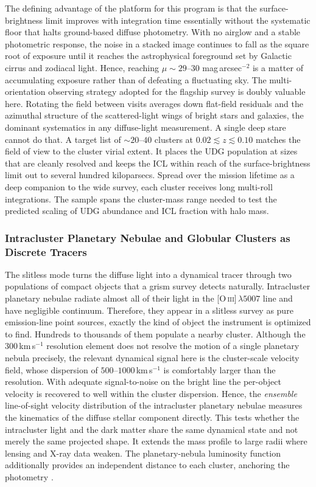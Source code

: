 \documentclass[10pt,onecolumn]{article}
\begin{document}
The defining advantage of the platform for this program is that the surface-brightness limit improves with integration time essentially without the systematic floor that halts ground-based diffuse photometry. With no airglow and a stable photometric response, the noise in a stacked image continues to fall as the square root of exposure until it reaches the astrophysical foreground set by Galactic cirrus and zodiacal light. Hence, reaching $\mu\sim29$--$30$ mag\,arcsec$^{-2}$ is a matter of accumulating exposure rather than of defeating a fluctuating sky. The multi-orientation observing strategy adopted for the flagship survey is doubly valuable here. Rotating the field between visits averages down flat-field residuals and the azimuthal structure of the scattered-light wings of bright stars and galaxies, the dominant systematics in any diffuse-light measurement. A single deep stare cannot do that. A target list of $\sim20$--$40$ clusters at $0.02\lesssim z\lesssim0.10$ matches the field of view to the cluster virial extent. It places the UDG population at sizes that are cleanly resolved and keeps the ICL within reach of the surface-brightness limit out to several hundred kiloparsecs. Spread over the mission lifetime as a deep companion to the wide survey, each cluster receives long multi-roll integrations. The sample spans the cluster-mass range needed to test the predicted scaling of UDG abundance and ICL fraction with halo mass.

\subsubsection{Intracluster Planetary Nebulae and Globular Clusters as Discrete Tracers}

The slitless mode turns the diffuse light into a dynamical tracer through two populations of compact objects that a grism survey detects naturally. Intracluster planetary nebulae radiate almost all of their light in the [O\,\textsc{iii}]\,$\lambda5007$ line and have negligible continuum. Therefore, they appear in a slitless survey as pure emission-line point sources, exactly the kind of object the instrument is optimized to find. Hundreds to thousands of them populate a nearby cluster. Although the $300$\,km\,s$^{-1}$ resolution element does not resolve the motion of a single planetary nebula precisely, the relevant dynamical signal here is the cluster-scale velocity field, whose dispersion of $500$--$1000$\,km\,s$^{-1}$ is comfortably larger than the resolution. With adequate signal-to-noise on the bright line the per-object velocity is recovered to well within the cluster dispersion. Hence, the \emph{ensemble} line-of-sight velocity distribution of the intracluster planetary nebulae measures the kinematics of the diffuse stellar component directly. This tests whether the intracluster light and the dark matter share the same dynamical state and not merely the same projected shape. It extends the mass profile to large radii where lensing and X-ray data weaken. The planetary-nebula luminosity function additionally provides an independent distance to each cluster, anchoring the photometry \cite{montes2022review}.
\end{document}

